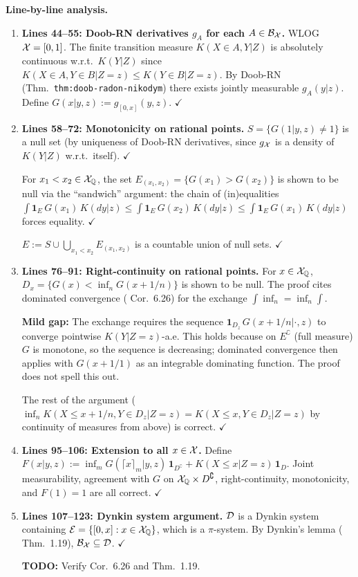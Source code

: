 \documentclass{article}
\begin{document}
\textbf{Line-by-line analysis.}
\begin{enumerate}[leftmargin=*]
  \item \textbf{Lines 44--55: Doob-RN derivatives $g_A$ for each $A \in \mathcal{B}_{\mathcal{X}}$.}
    WLOG $\mathcal{X}=[0,1]$.  The finite transition measure $K(X \in A,Y|Z)$ is
    absolutely continuous w.r.t.\ $K(Y|Z)$ since
    $K(X \in A, Y \in B|Z=z) \le K(Y \in B|Z=z)$.
    By Doob-RN (Thm.\ \texttt{thm:doob-radon-nikodym}) there exists jointly
    measurable $g_A(y|z)$.  Define $G(x|y,z):=g_{[0,x]}(y,z)$.  $\checkmark$

  \item \textbf{Lines 58--72: Monotonicity on rational points.}
    $S=\{G(1|y,z)\neq 1\}$ is a null set (by uniqueness of Doob-RN derivatives,
    since $g_{\mathcal{X}}$ is a density of $K(Y|Z)$ w.r.t.\ itself).  $\checkmark$

    For $x_1<x_2\in\mathcal{X}_{\mathbb{Q}}$, the set $E_{(x_1,x_2)}=\{G(x_1)>G(x_2)\}$ is shown to be
    null via the ``sandwich'' argument: the chain of (in)equalities
    $\int\mathbf{1}_E\,G(x_1)\,K(dy|z) \le \int\mathbf{1}_E\,G(x_2)\,K(dy|z) \le
     \int\mathbf{1}_E\,G(x_1)\,K(dy|z)$ forces equality.  $\checkmark$

    $E:=S\cup\bigcup_{x_1<x_2}E_{(x_1,x_2)}$ is a countable union of null sets.  $\checkmark$

  \item \textbf{Lines 76--91: Right-continuity on rational points.}
    For $x\in\mathcal{X}_{\mathbb{Q}}$, $D_x=\{G(x)<\inf_n G(x+1/n)\}$ is shown to be null.
    The proof cites dominated convergence (\cite{Kle20} Cor.\ 6.26) for the
    exchange $\int\inf_n=\inf_n\int$.

    \textbf{Mild gap:} The exchange requires the sequence
    $\mathbf{1}_{D_z}\,G(x+1/n|\cdot,z)$ to converge pointwise $K(Y|Z=z)$-a.e.
    This holds because on $E^\complement$ (full measure) $G$ is monotone, so the
    sequence is decreasing; dominated convergence then applies with
    $G(x+1/1)$ as an integrable dominating function.
    The proof does not spell this out.

    The rest of the argument ($\inf_n K(X\le x+1/n,Y\in D_z|Z=z) = K(X\le x,Y\in D_z|Z=z)$
    by continuity of measures from above) is correct.  $\checkmark$

  \item \textbf{Lines 95--106: Extension to all $x\in\mathcal{X}$.}
    Define $F(x|y,z):=\inf_m G(\lceil x\rceil_m|y,z)\,\mathbf{1}_{D^\complement}+
    K(X\le x|Z=z)\,\mathbf{1}_D$.  Joint measurability, agreement with $G$ on
    $\mathcal{X}_{\mathbb{Q}}\times D^\complement$, right-continuity, monotonicity, and $F(1)=1$
    are all correct.  $\checkmark$

  \item \textbf{Lines 107--123: Dynkin system argument.}
    $\mathcal{D}$ is a Dynkin system containing
    $\mathcal{E}=\{[0,x]:x\in\mathcal{X}_{\mathbb{Q}}\}$, which is a $\pi$-system.
    By Dynkin's lemma (\cite{Kle20} Thm.\ 1.19), $\mathcal{B}_{\mathcal{X}}\subseteq\mathcal{D}$.  $\checkmark$

    \textbf{TODO:} Verify \cite{Kle20} Cor.\ 6.26 and Thm.\ 1.19.
\end{enumerate}
\end{document}
